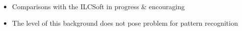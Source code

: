\documentclass[aspectratio=169, hyperref={colorlinks=true,pdfpagelabels=false,linkcolor=black}, xcolor=dvipsnames,10pt]{beamer}
\begin{document}
\begin{frame}
	
	
	\begin{itemize}
	\item Comparisons with the ILCSoft in progress \& encouraging
	\item The level of this background does not pose problem for pattern recognition
	\end{itemize}	
	
\end{frame}
\end{document}
